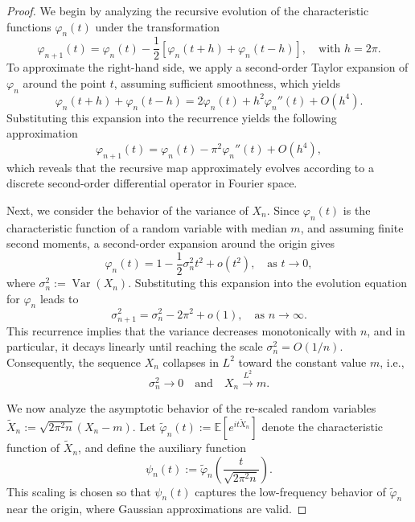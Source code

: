 \documentclass[10pt,a4paper]{amsart}
\begin{document}
\begin{proof}
	We begin by analyzing the recursive evolution of the characteristic functions \( \varphi_n(t) \) under the transformation
	\begin{equation}
		\varphi_{n+1}(t) = \varphi_n(t) - \frac{1}{2} \left[ \varphi_n(t + h) + \varphi_n(t - h) \right], \quad \text{with } h = 2\pi.
	\end{equation}
	To approximate the right-hand side, we apply a second-order Taylor expansion of \( \varphi_n \) around the point \( t \), assuming sufficient smoothness, which yields
	\begin{equation}
		\varphi_n(t + h) + \varphi_n(t - h) = 2 \varphi_n(t) + h^2 \varphi_n''(t) + O(h^4).
	\end{equation}
	Substituting this expansion into the recurrence yields the following approximation
	\begin{equation}
		\varphi_{n+1}(t) = \varphi_n(t) - \pi^2 \varphi_n''(t) + O(h^4),
	\end{equation}
	which reveals that the recursive map approximately evolves according to a discrete second-order differential operator in Fourier space.
	
	Next, we consider the behavior of the variance of \( X_n \). Since \( \varphi_n(t) \) is the characteristic function of a random variable with median \( m \), and assuming finite second moments, a second-order expansion around the origin gives
	\begin{equation}
		\varphi_n(t) = 1 - \frac{1}{2} \sigma_n^2 t^2 + o(t^2), \quad \text{as } t \to 0,
	\end{equation}
	where \( \sigma_n^2 := \operatorname{Var}(X_n) \). Substituting this expansion into the evolution equation for \( \varphi_n \) leads to
	\begin{equation}
		\sigma_{n+1}^2 = \sigma_n^2 - 2\pi^2 + o(1), \quad \text{as } n \to \infty.
	\end{equation}
	This recurrence implies that the variance decreases monotonically with \( n \), and in particular, it decays linearly until reaching the scale \( \sigma_n^2 = O(1/n) \). Consequently, the sequence \( X_n \) collapses in \( L^2 \) toward the constant value \( m \), i.e.,
	\begin{equation}
		\sigma_n^2 \to 0 \quad \text{and} \quad X_n \xrightarrow{L^2} m.
	\end{equation}
	
	\noindent We now analyze the asymptotic behavior of the re-scaled random variables \( \widetilde{X}_n := \sqrt{2\pi^2 n}(X_n - m) \). Let \( \widetilde{\varphi}_n(t) := \mathbb{E}[e^{it \widetilde{X}_n}] \) denote the characteristic function of \( \widetilde{X}_n \), and define the auxiliary function
	\begin{equation}
		\psi_n(t) := \widetilde{\varphi}_n\left( \frac{t}{\sqrt{2\pi^2 n}} \right).
	\end{equation}
	This scaling is chosen so that \( \psi_n(t) \) captures the low-frequency behavior of \( \widetilde{\varphi}_n \) near the origin, where Gaussian approximations are valid.
	

\end{proof}
\end{document}
